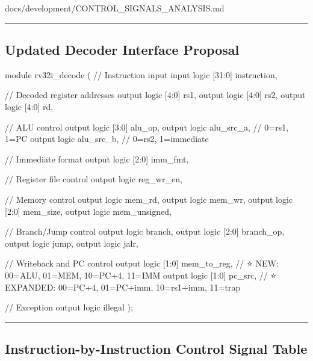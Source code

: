 \begin{relocated}{docs/development/CONTROL_SIGNALS_ANALYSIS.md}
\begin{center}\rule{0.5\linewidth}{0.5pt}\end{center}

\subsection{Updated Decoder Interface Proposal}\label{tm:flow:control-signals-analysis:updated-decoder-interface-proposal}

\begin{textblock}
module rv32i_decode (
  // Instruction input
  input  logic [31:0] instruction,

  // Decoded register addresses
  output logic [4:0]  rs1,
  output logic [4:0]  rs2,
  output logic [4:0]  rd,

  // ALU control
  output logic [3:0]  alu_op,
  output logic        alu_src_a,    // 0=rs1, 1=PC
  output logic        alu_src_b,    // 0=rs2, 1=immediate

  // Immediate format
  output logic [2:0]  imm_fmt,

  // Register file control
  output logic        reg_wr_en,

  // Memory control
  output logic        mem_rd,
  output logic        mem_wr,
  output logic [2:0]  mem_size,
  output logic        mem_unsigned,

  // Branch/Jump control
  output logic        branch,
  output logic [2:0]  branch_op,
  output logic        jump,
  output logic        jalr,

  // Writeback and PC control
  output logic [1:0]  mem_to_reg,   // ⭐ NEW: 00=ALU, 01=MEM, 10=PC+4, 11=IMM
  output logic [1:0]  pc_src,       // ⭐ EXPANDED: 00=PC+4, 01=PC+imm, 10=rs1+imm, 11=trap

  // Exception
  output logic        illegal
);
\end{textblock}

\begin{center}\rule{0.5\linewidth}{0.5pt}\end{center}

\subsection{Instruction-by-Instruction Control Signal Table}\label{tm:flow:control-signals-analysis:instruction-by-instruction-control-signal-table}

{\small\setlength{\tabcolsep}{4pt}

}
\end{relocated}
